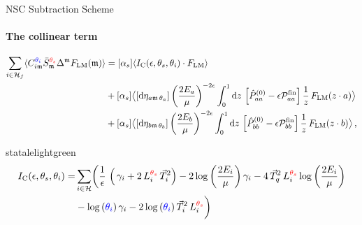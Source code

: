 \begin{frame} {NSC Subtraction Scheme}
  \framesubtitle{The collinear term}
\begin{equation*}
  \begin{aligned}
    \sum_{i \in \mathcal{H}_f} \langle C_{i\mathfrak{m}}^{\textcolor{blue}{\theta_i}} \bar{S}_{\mathfrak{m}}^{\textcolor{red}{\theta_s}} \Delta^{\mathfrak{m}} F_{\mathrm{LM}}(\mathfrak{m})\rangle &= [\alpha_s]\langle I_{\mathrm{C}}(\epsilon, \theta_s, \theta_i) \cdot F_{\mathrm{LM}} \rangle \\
    & + [\alpha_s] \bigl< [\mathrm{d}\eta_{a\mathfrak{m} \, \theta_a}] \left(\frac{2E_a}{\mu}\right)^{-2\epsilon} \int_{0}^{1} \mathrm{d}z \, \left[\hat{P}_{aa}^{(0)}-\epsilon \mathcal{P}_{aa}^{\mathrm{fin}}\right] \frac{1}{z} \, F_{\mathrm{LM}}(z\cdot a) \bigr> \\
    & + [\alpha_s] \bigl< [\mathrm{d}\eta_{b\mathfrak{m} \, \theta_b}] \left(\frac{2E_b}{\mu}\right)^{-2\epsilon} \int_{0}^{1} \mathrm{d}z \, \left[\hat{P}_{bb}^{(0)}-\epsilon \mathcal{P}_{bb}^{\mathrm{fin}}\right] \frac{1}{z} \, F_{\mathrm{LM}}(z\cdot b) \bigr> \, ,
  \end{aligned}
\end{equation*}
\begin{colorblock}[black]{statalelightgreen}{}
  \begin{equation*}
  \begin{aligned}
    I_{\mathrm{C}} (\epsilon, \theta_s, \theta_i) = &\sum_{i \in \mathcal{H}} \biggl( \frac{1}{\epsilon}\, \left(\, \gamma_i+  2 \,L_i^{\textcolor{red}{\theta_s}} \,\vec{T}_i^2 \right) - 2 \log{\left(\frac{2E_i}{\mu}\right)}\, \gamma_i  - 4 \, \vec{T}_q^2 \, L_i^{\textcolor{red}{\theta_s}} \log{\left(\frac{2E_i}{\mu}\right)} \\
    & - \log{(\textcolor{blue}{\theta_i})} \, \gamma_i - 2 \log{(\textcolor{blue}{\theta_i})} \, \vec{T}_i^2 \, L_i^{\textcolor{red}{\theta_s}} \biggr) 
    \label{green}
  \end{aligned}
\end{equation*}
      \end{colorblock}

\end{frame}

